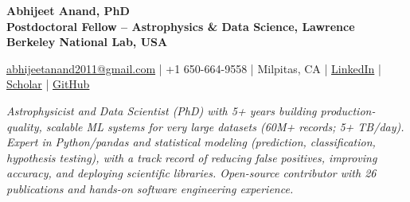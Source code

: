 \documentclass[a4paper,10pt]{article}
\begin{document}
\begin{center}
    {\huge \textbf{Abhijeet Anand, PhD}} \\
    {\normalsize \vspace{1.5mm}
    \textbf{Postdoctoral Fellow – Astrophysics \& Data Science, Lawrence Berkeley National Lab, USA}}
    \vspace{-1mm}
    \begin{center}
    \normalfont
\href{mailto:abhijeetanand2011@gmail.com}{abhijeetanand2011@gmail.com} \quad |
\quad
    +1 650-664-9558 \quad | \quad Milpitas, CA \quad |
\quad
    \href{https://www.linkedin.com/in/abhijeet-anand-iisc}{LinkedIn} \quad | \quad
    \href{https://scholar.google.com/citations?hl=en&user=MfOuq1IAAAAJ}{Scholar} \quad |
\quad
    \href{https://github.com/abhi0395}{GitHub}
    \end{center}
\end{center}
\begin{center}
\vspace*{-1.25mm}
\textit{Astrophysicist and Data Scientist (PhD) with 5+ years building production-quality, scalable ML systems for very large datasets (60M+ records; 5+ TB/day). Expert in Python/pandas and statistical modeling (prediction, classification, hypothesis testing), with a track record of reducing false positives, improving accuracy, and deploying scientific libraries. Open-source contributor with 26 publications and hands-on software engineering experience.}

\end{center}
\vspace*{-6mm}
\end{document}
